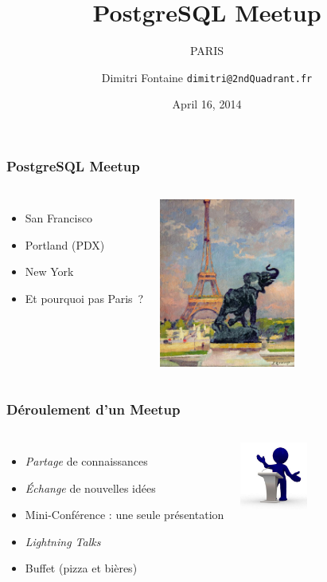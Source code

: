 \documentclass{beamer}
\title{PostgreSQL Meetup}
\subtitle{PARIS}
\author{Dimitri Fontaine \texttt{dimitri@2ndQuadrant.fr}}
\date{April 16, 2014}
\begin{document}
\frame{\titlepage}

\begin{frame}[fragile]
  \frametitle{PostgreSQL Meetup}

  \vfill

\begin{columns}

  \begin{itemize}
  \item San Francisco
  \item Portland (PDX)
  \item New York
  \item Et pourquoi pas Paris ?
  \end{itemize}

\begin{center}
  \includegraphics[height=15em]{the-eiffel-tower-and-the-elephant-by-fremiet-jules-ernest-renoux.jpg}
\end{center}
\end{columns}
\end{frame}

\begin{frame}[fragile]
  \frametitle{Déroulement d'un Meetup}

  \vfill

\begin{columns}

\begin{itemize}
\item \textit{Partage} de connaissances
\item \textit{Échange} de nouvelles idées
\item Mini-Conférence : une seule présentation
\item \textit{Lightning Talks}
\item Buffet (pizza et bières)
\end{itemize}

\begin{center}
  \includegraphics[height=6em]{conferences.jpg}
\end{center}
\end{columns}
\end{frame}
\end{document}
